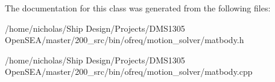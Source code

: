 The documentation for this class was generated from the following files\-:\begin{DoxyCompactItemize}
\item 
/home/nicholas/\-Ship Design/\-Projects/\-D\-M\-S1305 Open\-S\-E\-A/master/200\-\_\-src/bin/ofreq/motion\-\_\-solver/matbody.\-h\item 
/home/nicholas/\-Ship Design/\-Projects/\-D\-M\-S1305 Open\-S\-E\-A/master/200\-\_\-src/bin/ofreq/motion\-\_\-solver/matbody.\-cpp\end{DoxyCompactItemize}
